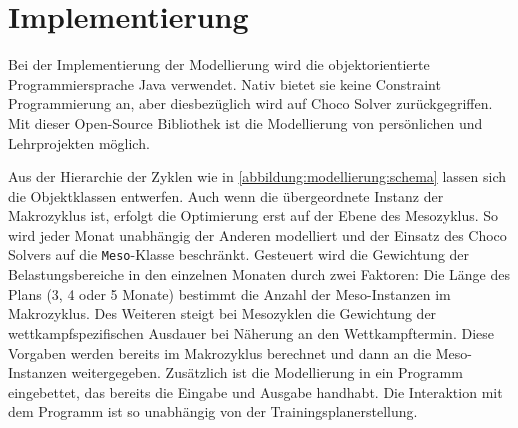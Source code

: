 \chapter{Implementierung}
\label{sec:implementierung} 
Bei der Implementierung der Modellierung wird die objektorientierte Programmiersprache Java \cite{java} verwendet. Nativ bietet sie keine Constraint Programmierung an, aber diesbezüglich wird auf Choco Solver \cite{ChocoSolverWeb} zurückgegriffen. Mit dieser Open-Source Bibliothek ist die Modellierung von persönlichen und Lehrprojekten möglich. \par
Aus der Hierarchie der Zyklen wie in \ref{abbildung:modellierung:schema} lassen sich die Objektklassen entwerfen. Auch wenn die übergeordnete Instanz der Makrozyklus ist, erfolgt die Optimierung erst auf der Ebene des Mesozyklus. So wird jeder Monat unabhängig der Anderen modelliert und der Einsatz des Choco Solvers auf die \texttt{Meso}-Klasse beschränkt. Gesteuert wird die Gewichtung der Belastungsbereiche in den einzelnen Monaten durch zwei Faktoren: Die Länge des Plans (3, 4 oder 5 Monate) bestimmt die Anzahl der Meso-Instanzen im Makrozyklus. Des Weiteren steigt bei Mesozyklen die Gewichtung der wettkampfspezifischen Ausdauer bei Näherung an den Wettkampftermin. Diese Vorgaben werden bereits im Makrozyklus berechnet und dann an die Meso-Instanzen weitergegeben.
Zusätzlich ist die Modellierung in ein Programm eingebettet, das bereits die Eingabe und Ausgabe handhabt. Die Interaktion mit dem Programm ist so unabhängig von der Trainingsplanerstellung. \par

